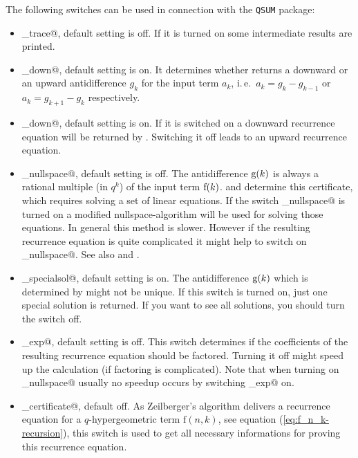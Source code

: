The following switches can be used in connection with
the \texttt{QSUM} package:
%
\begin{itemize}
	\item \verb@qsum_trace@, default setting is off. If it is
		turned on some intermediate results are printed.
	\item \verb@qgosper_down@, default setting is on. It determines
		whether \verb@qgosper@ returns a downward or an upward
		antidifference $g_k$ for the input term $a_k$,
	   i.\,e.\ $a_k=g_k-g_{k-1}$ or $a_k=g_{k+1}-g_k$ respectively.
	\item \verb@qsumrecursion_down@, default setting is on. If it is
		switched on a downward recurrence equation will be returned by
		\verb@qsumrecursion@. Switching it off leads to an upward
		recurrence equation.
	\item \verb@qsum_nullspace@, default setting is off. The 
		antidifference $\fcn{g}{k}$ is always a rational multiple (in $q^k$)
		of the input term $\fcn{f}{k}$. \verb@qgosper@ and \verb@qsumrecursion@
		determine this certificate, which requires solving a set of
		linear equations. If the switch \verb@qsum_nullspace@ is
		turned on a modified nullspace-algorithm will be used for
		solving those equations. In general this method is slower.
		However if the resulting recurrence equation is quite complicated
		it might help to switch on \verb@qsum_nullspace@.
		See also \cite{Knuth} and \cite{Paule1}.
	\item \verb@qgosper_specialsol@, default setting is on. The
		antidifference $\fcn{g}{k}$ which is determined by 
		\verb@qgosper@ might not be unique. If this switch is turned on,
		just one special solution is returned. If you want
		to see all solutions, you should turn the switch off.
	\item \verb@qsumrecursion_exp@, default setting is off. This
		switch determines if the coefficients of the
		resulting recurrence equation should
		be factored. Turning it off might speed up the calculation
		(if factoring is complicated). Note that
		when turning on \verb@qsum_nullspace@ usually no speedup
		occurs by switching \verb@qsumrecursion_exp@ on.
	\item \verb@qsumrecursion_certificate@, default off. 
		As Zeilberger's algorithm 
		delivers a recurrence equation for a $q$-hypergeometric term
		$\mathrm{f}(n,k)$, see equation (\ref{eq:f_n_k-recursion}),
		this switch is used to get all necessary informations for
		proving this recurrence equation.


\end{itemize}
